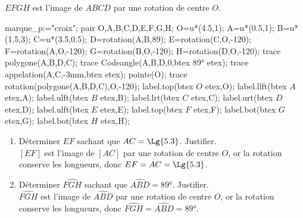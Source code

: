 \begin{corrige}
    $EFGH$ est l'image de $ABCD$ par une rotation de centre $O$.\\
    \begin{Geometrie}[CoinHD={(8u,5u)}]
        marque_p:="croix";
        pair O,A,B,C,D,E,F,G,H;
        O=u*(4.5,1);
        A=u*(0.5,1);
        B=u*(1.5,3);
        C=u*(3.5,0.5);
        D=rotation(A,B,89);
        E=rotation(C,O,-120);
        F=rotation(A,O,-120);
        G=rotation(B,O,-120);
        H=rotation(D,O,-120);
        trace polygone(A,B,D,C);
        trace Codeangle(A,B,D,0,btex \ang{89} etex);
        trace appelation(A,C,-3mm,btex  etex);
        pointe(O);
        trace rotation(polygone(A,B,D,C),O,-120);
        label.top(btex $O$ etex,O);
        label.llft(btex $A$ etex,A);
        label.ulft(btex $B$ etex,B);
        label.lrt(btex $C$ etex,C);
        label.urt(btex $D$ etex,D);
        label.ulft(btex $E$ etex,E);
        label.top(btex $F$ etex,F);
        label.bot(btex $G$ etex,G);
        label.bot(btex $H$ etex,H);
    \end{Geometrie}
    \begin{enumerate}
        \item Déterminer $EF$ sachant que $AC=\Lg{5.3}$. Justifier.\\
        {\red $[EF]$ est l'image de $[AC]$ par une rotation de centre $O$, or la rotation conserve les longueurs, donc $EF=AC=\Lg{5.3}$.}
        \item Déterminer $\widehat{FGH}$ sachant que $\widehat{ABD}=\ang{89}$. Justifier.\\
        {\red $\widehat{FGH}$ est l'image de $\widehat{ABD}$ par une rotation de centre $O$, or la rotation conserve les longueurs, donc $\widehat{FGH}=\widehat{ABD}=\ang{89}$.}
    \end{enumerate}  
\end{corrige}

